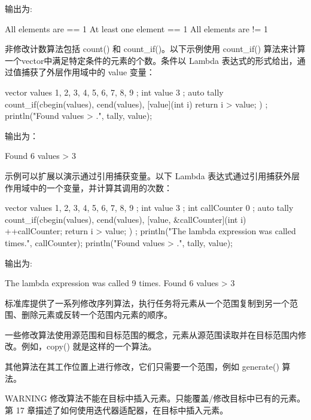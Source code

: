 输出为:

\begin{shell}
All elements are == 1
At least one element == 1
All elements are != 1
\end{shell}


非修改计数算法包括 count() 和 count\_if()。以下示例使用 count\_if() 算法来计算一个vector中满足特定条件的元素的个数。条件以 Lambda 表达式的形式给出，通过值捕获了外层作用域中的 value 变量：

\begin{cpp}
vector values { 1, 2, 3, 4, 5, 6, 7, 8, 9 };
int value { 3 };
auto tally { count_if(cbegin(values), cend(values),
    [value](int i){ return i > value; }) };
println("Found {} values > {}.", tally, value);
\end{cpp}

输出为：

\begin{shell}
Found 6 values > 3
\end{shell}

示例可以扩展以演示通过引用捕获变量。以下 Lambda 表达式通过引用捕获外层作用域中的一个变量，并计算其调用的次数：

\begin{cpp}
vector values { 1, 2, 3, 4, 5, 6, 7, 8, 9 };
int value { 3 };
int callCounter { 0 };
auto tally { count_if(cbegin(values), cend(values),
    [value, &callCounter](int i){ ++callCounter; return i > value; }) };
println("The lambda expression was called {} times.", callCounter);
println("Found {} values > {}.", tally, value);
\end{cpp}

输出为:

\begin{shell}
The lambda expression was called 9 times.
Found 6 values > 3
\end{shell}


标准库提供了一系列修改序列算法，执行任务将元素从一个范围复制到另一个范围、删除元素或反转一个范围内元素的顺序。

一些修改算法使用源范围和目标范围的概念，元素从源范围读取并在目标范围内修改。例如，copy() 就是这样的一个算法。

其他算法在其工作位置上进行修改，它们只需要一个范围，例如 generate() 算法。

\begin{myWarning}{WARNING}
修改算法不能在目标中插入元素。只能覆盖/修改目标中已有的元素。第 17 章描述了如何使用迭代器适配器，在目标中插入元素。
\end{myWarning}

